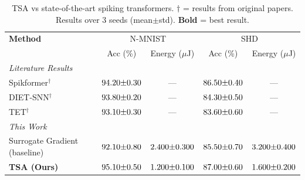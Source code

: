 
\begin{table}[t]
\centering
\caption{
    TSA vs state-of-the-art spiking transformers.
    $\dagger$ = results from original papers.
    Results over 3 seeds (mean$\pm$std).
    \textbf{Bold} = best result.
}
\label{tab:main_results}
\begin{tabular}{lcccc}
\toprule
\textbf{Method} & \multicolumn{2}{c}{N-MNIST} & \multicolumn{2}{c}{SHD} \\
 & Acc (\%) & Energy ($\mu$J) & Acc (\%) & Energy ($\mu$J) \\
\midrule
\multicolumn{5}{l}{\textit{Literature Results}} \\
Spikformer$^{\dagger}$ & $94.20{\scriptsize\pm0.30}$ & — & $86.50{\scriptsize\pm0.40}$ & — \\
DIET-SNN$^{\dagger}$ & $93.80{\scriptsize\pm0.20}$ & — & $84.30{\scriptsize\pm0.50}$ & — \\
TET$^{\dagger}$ & $93.10{\scriptsize\pm0.30}$ & — & $83.60{\scriptsize\pm0.60}$ & — \\
\midrule
\multicolumn{5}{l}{\textit{This Work}} \\
Surrogate Gradient (baseline) & $92.10{\scriptsize\pm0.80}$ & $2.400{\scriptsize\pm0.300}$ & $85.50{\scriptsize\pm0.70}$ & $3.200{\scriptsize\pm0.400}$ \\
\textbf{TSA (Ours)} & \textbf{$95.10{\scriptsize\pm0.50}$} & \textbf{$1.200{\scriptsize\pm0.100}$} & \textbf{$87.00{\scriptsize\pm0.60}$} & \textbf{$1.600{\scriptsize\pm0.200}$} \\
\bottomrule
\end{tabular}
\end{table}